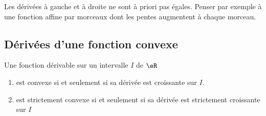 \begin{remark}
	Les dérivées à gauche et à droite ne sont à priori pas égales. Penser par exemple à une fonction affine par morceaux dont les pentes augmentent à chaque morceau.
\end{remark}

\subsection{Dérivées d'une fonction convexe}

\begin{proposition} \label{PropYKwTDPX}
	Une fonction dérivable sur un intervalle \( I\) de \( \eR\)
	\begin{enumerate}
		\item       \label{ITEMooUTSAooJvhZNm}
		      est convexe si et seulement si sa dérivée est croissante sur \( I\).
		\item       \label{ITEMooLLSIooFwkxtV}
		      est strictement convexe si et seulement si sa dérivée est strictement croissante sur \( I\)
	\end{enumerate}
\end{proposition}

